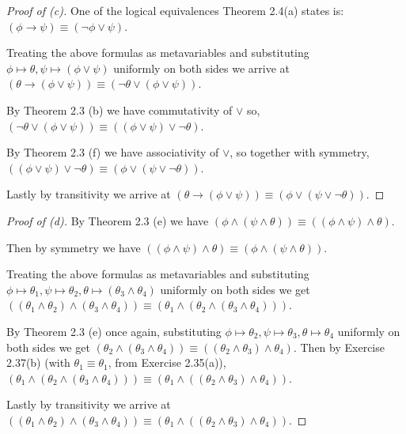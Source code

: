 \documentclass{article}
\theoremstyle{remark}\newtheorem{remark}{Remark}
\theoremstyle{plain}
\begin{document}

\begin{proof}[Proof of (c)]
    One of the logical equivalences Theorem 2.4(a) states is: $(\phi \to \psi) \equiv (\neg\phi \lor \psi)$.

    Treating the above formulas as metavariables and substituting $\phi \mapsto \theta, \psi \mapsto (\phi \lor \psi)$ uniformly on both sides we arrive at $(\theta \to (\phi \lor \psi)) \equiv (\neg\theta \lor (\phi \lor \psi))$.

    By Theorem 2.3 (b) we have commutativity of $\lor$ so, $(\neg\theta \lor (\phi \lor \psi)) \equiv ((\phi \lor \psi) \lor \neg\theta)$.

    By Theorem 2.3 (f) we have associativity of $\lor$, so together with symmetry, $((\phi \lor \psi) \lor \neg\theta) \equiv (\phi \lor (\psi \lor \neg\theta))$.

    Lastly by transitivity we arrive at $(\theta \to (\phi \lor \psi)) \equiv (\phi \lor (\psi \lor \neg\theta))$.
\end{proof}


\begin{proof}[Proof of (d)]
    By Theorem 2.3 (e) we have $(\phi \land (\psi \land \theta)) \equiv ((\phi \land \psi) \land \theta)$.

    Then by symmetry we have $((\phi \land \psi) \land \theta) \equiv (\phi \land (\psi \land \theta))$.

    Treating the above formulas as metavariables and substituting $\phi \mapsto \theta_1, \psi \mapsto \theta_2, \theta \mapsto (\theta_3 \land \theta_4)$ uniformly on both sides we get $((\theta_1 \land \theta_2) \land (\theta_3 \land \theta_4)) \equiv (\theta_1 \land (\theta_2 \land (\theta_3 \land \theta_4)))$.

    By Theorem 2.3 (e) once again, substituting $\phi \mapsto \theta_2, \psi \mapsto \theta_3, \theta \mapsto \theta_4$ uniformly on both sides we get $(\theta_2 \land (\theta_3 \land \theta_4)) \equiv ((\theta_2 \land \theta_3) \land \theta_4)$. Then by Exercise 2.37(b) (with $\theta_1 \equiv \theta_1$, from Exercise 2.35(a)), $(\theta_1 \land (\theta_2 \land (\theta_3 \land \theta_4))) \equiv (\theta_1 \land ((\theta_2 \land \theta_3) \land \theta_4))$.

    Lastly by transitivity we arrive at $((\theta_1 \land \theta_2) \land (\theta_3 \land \theta_4)) \equiv (\theta_1 \land ((\theta_2 \land \theta_3) \land \theta_4))$.
\end{proof}
\end{document}
